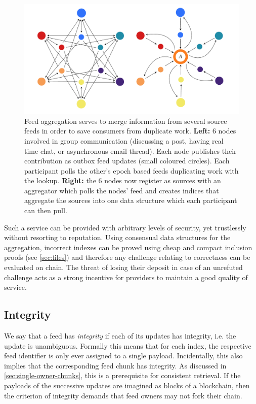 \begin{figure}[htbp]
\centering
\includegraphics[width=\textwidth]{fig/feed-aggregation-2.pdf}
\caption[Feed aggregation \statusyellow]{Feed aggregation serves to merge information from several source feeds in order to save consumers from duplicate work. \textbf{Left:} 6 nodes involved in group communication (discussing a post, having real time chat, or asynchronous email thread). Each node publishes their contribution as outbox feed updates (small coloured circles). Each participant polls the other's epoch based feeds duplicating work with the lookup. \textbf{Right:} the 6 nodes now register  as sources  with an aggregator which polls the nodes' feed and creates indices that aggregate the sources into one data structure which each participant can then pull.}
\label{fig:feed-aggregation}
\end{figure}

Such a service can be provided with arbitrary levels of security, yet trustlessly without resorting to reputation. Using consensual data structures for the aggregation, incorrect indexes can be proved using cheap and compact inclusion proofs (see \ref{sec:files}) and therefore any challenge relating to correctness can be evaluated on chain. The threat of losing their deposit in case of an unrefuted challenge acts as a strong incentive for providers to maintain a good quality of service.

\subsection{Integrity \statusyellow}\label{sec:feed-integrity}

We say that a feed has \emph{integrity} if each of its updates has integrity, i.e. the update is unambiguous. Formally this means that for each index, the respective feed identifier is only ever assigned to a single payload. Incidentally, this also implies that the corresponding feed chunk has integrity. As discussed in \ref{sec:single-owner-chunks}, this is a prerequisite for consistent retrieval. 
If the payloads of the successive updates are imagined as blocks of a blockchain, then the criterion of integrity demands that feed owners may not fork their chain. 


